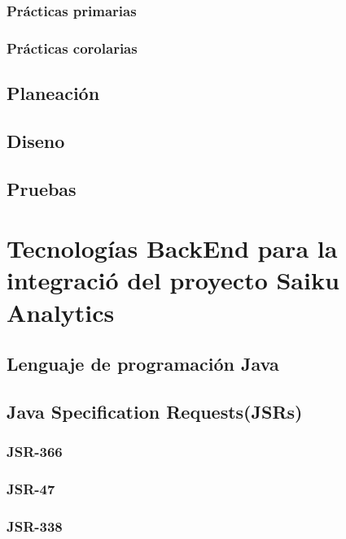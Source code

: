 		\subsubsection{Pr\'{a}cticas primarias}
		\subsubsection{Pr\'{a}cticas corolarias}
	\subsection{Planeaci\'{o}n}
	\subsection{Diseno}
	\subsection{Pruebas}
\section{Tecnolog\'{i}as BackEnd para la integraci\'{o} del proyecto Saiku Analytics}
		\lipsum[1-2]
	\subsection{Lenguaje de programaci\'{o}n Java}
			\lipsum[1-2]
	\subsection{Java Specification Requests(JSRs)}
		\subsubsection{JSR-366}
				\lipsum[1-2]
		\subsubsection{JSR-47}
				\lipsum[1-2]
		\subsubsection{JSR-338}
				\lipsum[1-2]
